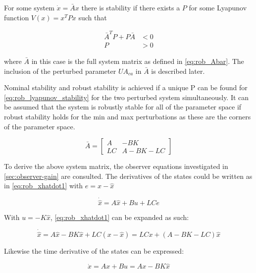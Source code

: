 \noindent For some system $\dot{x} = \bar{A}x$ there is stability if there exists a $P$ for some Lyapunov function $V(x) = x^TPx$ such that

\begin{equation} \label{eq:rob_lyapunov_stability}
	\begin{split}
	\bar{A}^TP+P\bar{A} &< 0 \\
	P &> 0
	\end{split}
\end{equation}

\noindent where $\bar{A}$ in this case is the full system matrix as defined in \cref{eq:rob_Abar}. The inclusion of the perturbed parameter $U A_{ca}$ in $\bar{A}$ is described later.

Nominal stability and robust stability is achieved if a unique P can be found for \cref{eq:rob_lyapunov_stability} for the two perturbed system simultaneously. It can be assumed that the system is robustly stable for all of the parameter space if robust stability holds for the min and max perturbations as these are the corners of the parameter space.

\begin{equation} \label{eq:rob_Abar}
	\bar{A} = \begin{bmatrix}
				A & -BK \\ LC & A-BK-LC
				\end{bmatrix}
\end{equation}

\noindent To derive the above system matrix, the observer equations investigated in \cref{sec:observer-gain} are consulted. The derivatives of the states could be written as in \cref{eq:rob_xhatdot1} with $e = x - \hat{x}$

\begin{equation} \label{eq:rob_xhatdot1}
	\dot{\hat{x}} = A\hat{x} + Bu + LCe
\end{equation}

\noindent With $u = -K\hat{x}$, \cref{eq:rob_xhatdot1} can be expanded as such:

\begin{equation} \label{eq:rob_xhatdot2}
	\dot{\hat{x}} = A\hat{x} - BK\hat{x} + LC(x - \hat{x}) =  LCx + (A - BK - LC)\hat{x}
\end{equation}

\noindent Likewise the time derivative of the states can be expressed:

\begin{equation} \label{eq:rob_xdot}
	\dot{x} = Ax + Bu = Ax - BK\hat{x}
\end{equation}

